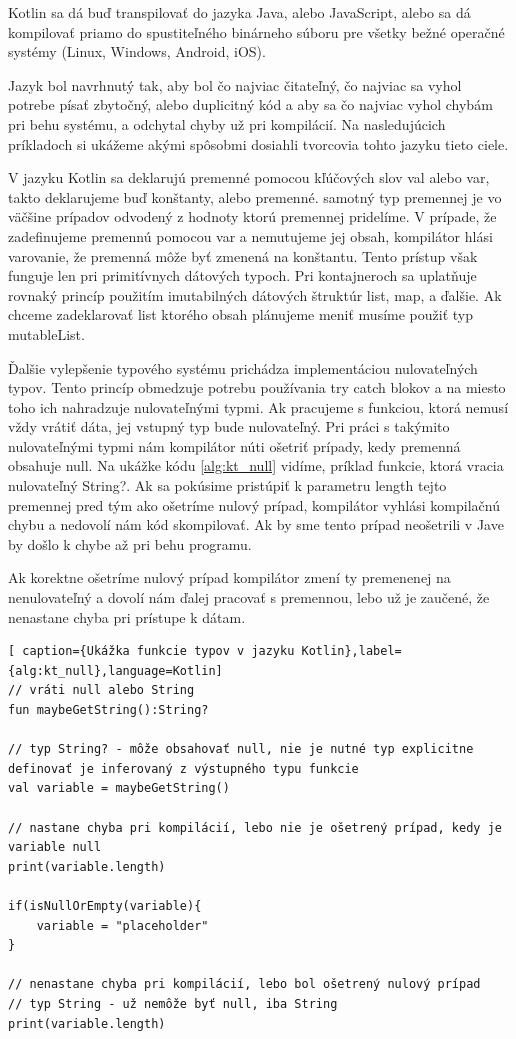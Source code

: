 Kotlin sa dá buď transpilovať do jazyka Java, alebo JavaScript, alebo sa dá kompilovať priamo do spustiteľného binárneho súboru pre všetky bežné operačné systémy (Linux, Windows, Android, iOS).

Jazyk bol navrhnutý tak, aby bol čo najviac čitateľný, čo najviac sa vyhol potrebe písať zbytočný, alebo duplicitný kód a aby sa čo najviac vyhol chybám pri behu systému, a odchytal chyby už pri kompilácií. Na nasledujúcich príkladoch si ukážeme akými spôsobmi dosiahli tvorcovia tohto jazyku tieto ciele. 

V jazyku Kotlin sa deklarujú premenné pomocou kľúčových slov val alebo var, takto deklarujeme buď konštanty, alebo premenné. samotný typ premennej je vo väčšine prípadov odvodený z hodnoty ktorú premennej pridelíme. V prípade, že zadefinujeme premennú pomocou var a nemutujeme jej obsah, kompilátor hlási varovanie, že premenná môže byť zmenená na konštantu. Tento prístup však funguje len pri primitívnych dátových typoch. Pri kontajneroch sa uplatňuje rovnaký princíp použitím imutabilných dátových štruktúr list, map, a ďalšie. Ak chceme zadeklarovať list ktorého obsah plánujeme meniť musíme použiť typ mutableList. 

Ďalšie vylepšenie typového systému prichádza implementáciou nulovateľných typov. Tento princíp obmedzuje potrebu používania try catch blokov a na miesto toho ich nahradzuje nulovateľnými typmi. Ak pracujeme s funkciou, ktorá nemusí vždy vrátiť dáta, jej vstupný typ bude nulovateľný. Pri práci s takýmito nulovateľnými typmi nám kompilátor núti ošetriť prípady, kedy premenná obsahuje null. Na ukážke kódu \ref{alg:kt_null} vidíme, príklad funkcie, ktorá vracia nulovateľný String?. Ak sa pokúsime pristúpiť k parametru length tejto premennej pred tým ako ošetríme nulový prípad, kompilátor vyhlási kompilačnú chybu a nedovolí nám kód skompilovať. Ak by sme tento prípad neošetrili v Jave by došlo k chybe až pri behu programu. 

Ak korektne ošetríme nulový prípad kompilátor zmení ty premenenej na nenulovateľný a dovolí nám ďalej pracovať s premennou, lebo už je zaučené, že nenastane chyba pri prístupe k dátam. 


\begin{lstlisting}[ caption={Ukážka funkcie typov v jazyku Kotlin},label={alg:kt_null},language=Kotlin]
// vráti null alebo String
fun maybeGetString():String?

// typ String? - môže obsahovať null, nie je nutné typ explicitne definovať je inferovaný z výstupného typu funkcie
val variable = maybeGetString()

// nastane chyba pri kompilácií, lebo nie je ošetrený prípad, kedy je variable null
print(variable.length)

if(isNullOrEmpty(variable){
	variable = "placeholder"
}

// nenastane chyba pri kompilácií, lebo bol ošetrený nulový prípad
// typ String - už nemôže byť null, iba String
print(variable.length)
\end{lstlisting}


